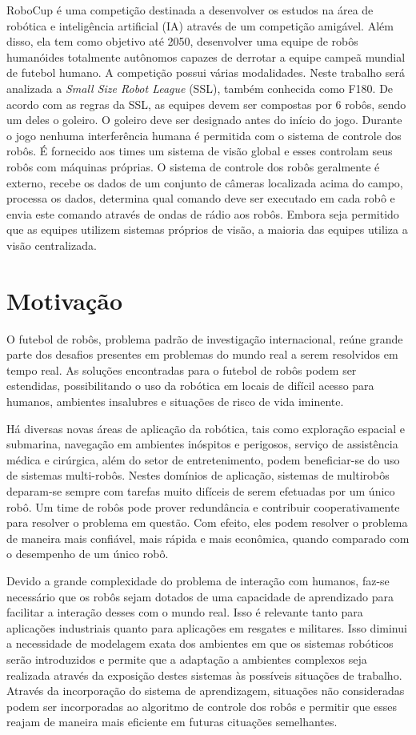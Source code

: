 RoboCup é uma competição destinada a desenvolver os estudos na área de robótica e
inteligência artificial (IA) através de um competição amigável. Além disso, ela tem
como objetivo até 2050, desenvolver uma equipe de robôs humanóides totalmente
autônomos capazes de derrotar a equipe campeã mundial de futebol humano. A competição
possui várias modalidades. Neste trabalho será analizada a \textit{Small Size Robot League} (SSL),
também conhecida como F180. De acordo com as regras da SSL, as equipes devem ser
compostas por 6 robôs, sendo um deles o goleiro. O goleiro deve ser
designado antes do início do jogo. Durante o jogo nenhuma interferência humana é
permitida com o sistema de controle dos robôs. É fornecido aos times um sistema de
visão global e esses controlam seus robôs com máquinas próprias. O sistema de controle
dos robôs geralmente é externo, recebe os dados de um conjunto de câmeras
localizada acima do campo, processa os dados, determina qual comando deve ser executado
em cada robô e envia este comando através de ondas de rádio aos robôs. Embora seja
permitido que as equipes utilizem sistemas próprios de visão, a maioria das equipes utiliza
a visão centralizada.

\section{Motivação}

O futebol de robôs, problema padrão de investigação internacional, reúne grande parte
dos desafios presentes em problemas do mundo real a serem resolvidos em tempo real.
As soluções encontradas para o futebol de robôs podem ser estendidas, possibilitando
o uso da robótica em locais de difícil acesso para humanos, ambientes insalubres e
situações de risco de vida iminente.

Há diversas novas áreas de aplicação da robótica, tais como exploração espacial e submarina,
navegação em ambientes inóspitos e perigosos, serviço de assistência médica
e cirúrgica, além do setor de entretenimento, podem beneficiar-se do uso de sistemas
multi-robôs. Nestes domínios de aplicação, sistemas de multirobôs deparam-se sempre
com tarefas muito difíceis de serem efetuadas por um único robô. Um time de robôs pode
prover redundância e contribuir cooperativamente para resolver o problema em questão.
Com efeito, eles podem resolver o problema de maneira mais confiável, mais rápida e
mais econômica, quando comparado com o desempenho de um único robô.

Devido a grande complexidade do problema de interação com humanos, faz-se necessário
que os robôs sejam dotados de uma capacidade de aprendizado para facilitar a interação
desses com o mundo real. Isso é relevante tanto para aplicações industriais quanto para
aplicações em resgates e militares. Isso diminui a necessidade de modelagem
exata dos ambientes em que os sistemas robóticos serão introduzidos e permite que
a adaptação a ambientes complexos seja realizada através da exposição destes sistemas
às possíveis situações de trabalho. Através da incorporação do sistema de
aprendizagem, situações não consideradas podem ser incorporadas ao algoritmo de
controle dos robôs e permitir que esses reajam de maneira mais eficiente em futuras
cituações semelhantes.

